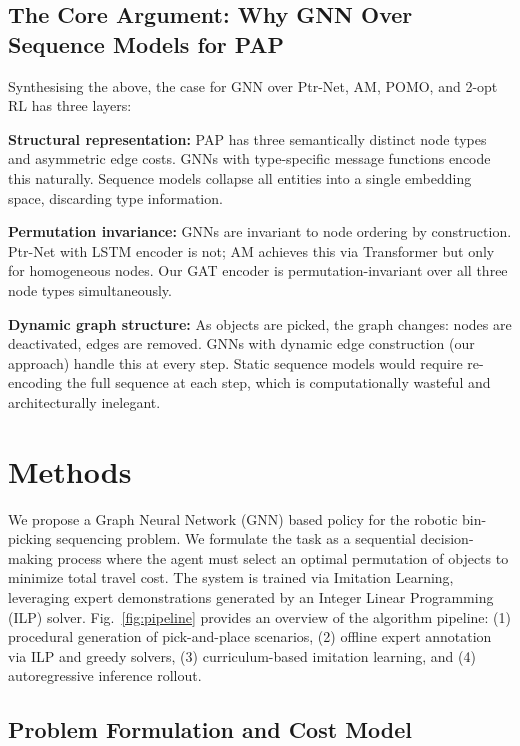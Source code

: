 \documentclass[conference]{IEEEtran}
\begin{document}
\subsection{The Core Argument: Why GNN Over Sequence Models for PAP}

Synthesising the above, the case for GNN over Ptr-Net, AM, POMO, and 2-opt RL has three layers:

\textbf{Structural representation:} PAP has three semantically distinct node types and asymmetric edge costs. GNNs with type-specific message functions encode this naturally. Sequence models collapse all entities into a single embedding space, discarding type information.

\textbf{Permutation invariance:} GNNs are invariant to node ordering by construction. Ptr-Net with LSTM encoder is not; AM achieves this via Transformer but only for homogeneous nodes. Our GAT encoder is permutation-invariant over all three node types simultaneously.

\textbf{Dynamic graph structure:} As objects are picked, the graph changes: nodes are deactivated, edges are removed. GNNs with dynamic edge construction (our approach) handle this at every step. Static sequence models would require re-encoding the full sequence at each step, which is computationally wasteful and architecturally inelegant.

\section{Methods}\label{sec:methods}

We propose a Graph Neural Network (GNN) based policy for the robotic bin-picking sequencing problem. We formulate the task as a sequential decision-making process where the agent must select an optimal permutation of objects to minimize total travel cost. The system is trained via Imitation Learning, leveraging expert demonstrations generated by an Integer Linear Programming (ILP) solver. Fig.~\ref{fig:pipeline} provides an overview of the algorithm pipeline: (1) procedural generation of pick-and-place scenarios, (2) offline expert annotation via ILP and greedy solvers, (3) curriculum-based imitation learning, and (4) autoregressive inference rollout.

\subsection{Problem Formulation and Cost Model}
\end{document}
